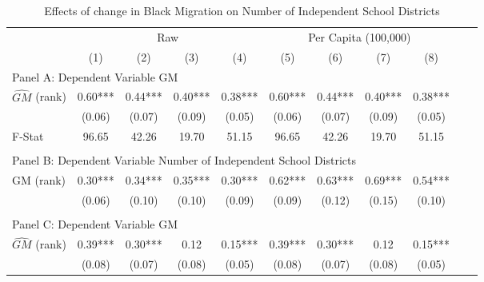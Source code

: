  \begin{table}[htbp]\centering {} \begin{threeparttable} \caption{Effects of change in Black Migration on Number of Independent School Districts} \begin{tabular}{l*{10}{c}} \toprule
                &\multicolumn{4}{c}{Raw}                                    &\multicolumn{4}{c}{Per Capita (100,000)}                   \\\cmidrule(lr){2-5}\cmidrule(lr){6-9}
                &\multicolumn{1}{c}{(1)}   &\multicolumn{1}{c}{(2)}   &\multicolumn{1}{c}{(3)}   &\multicolumn{1}{c}{(4)}   &\multicolumn{1}{c}{(5)}   &\multicolumn{1}{c}{(6)}   &\multicolumn{1}{c}{(7)}   &\multicolumn{1}{c}{(8)}   \\
\cmidrule(lr){1-9}
\multicolumn{8}{l}{Panel A: Dependent Variable GM}\\
\cmidrule(lr){1-9}
$\hat{GM}$ (rank)&       0.60***&       0.44***&       0.40***&       0.38***&       0.60***&       0.44***&       0.40***&       0.38***\\
                &     (0.06)   &     (0.07)   &     (0.09)   &     (0.05)   &     (0.06)   &     (0.07)   &     (0.09)   &     (0.05)   \\
\midrule
F-Stat          &      96.65   &      42.26   &      19.70   &      51.15   &      96.65   &      42.26   &      19.70   &      51.15   \\
\cmidrule[\heavyrulewidth](lr){1-9} \\ \cmidrule[\heavyrulewidth](lr){1-9}
\multicolumn{8}{l}{Panel B: Dependent Variable Number of Independent School Districts}\\
\cmidrule(lr){1-9}
GM  (rank)      &       0.30***&       0.34***&       0.35***&       0.30***&       0.62***&       0.63***&       0.69***&       0.54***\\
                &     (0.06)   &     (0.10)   &     (0.10)   &     (0.09)   &     (0.09)   &     (0.12)   &     (0.15)   &     (0.10)   \\
\cmidrule[\heavyrulewidth](lr){1-9} \\ \cmidrule[\heavyrulewidth](lr){1-9}
\multicolumn{8}{l}{Panel C: Dependent Variable GM}\\
\cmidrule(lr){1-9}
$\hat{GM}$ (rank)&       0.39***&       0.30***&       0.12   &       0.15***&       0.39***&       0.30***&       0.12   &       0.15***\\
                &     (0.08)   &     (0.07)   &     (0.08)   &     (0.05)   &     (0.08)   &     (0.07)   &     (0.08)   &     (0.05)   \\

\end{tabular}
\end{threeparttable}
\end{table}
